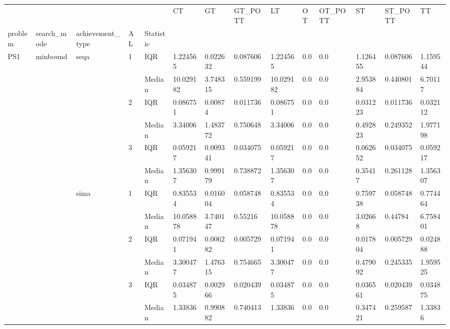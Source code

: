 \begin{tabular}{llllllllllllll}
\toprule
    &       &      &   &        &         CT &         GT &   GT\_POTT &         LT &        OT &   OT\_POTT &         ST &   ST\_POTT &         TT \\
problem & search\_mode & achievement\_type & AL & Statistic &            &            &           &            &           &           &            &           &            \\
\midrule
PS1 & minbound & seqa & 1 & IQR &   1.224565 &   0.022632 &  0.087606 &   1.224565 &       0.0 &       0.0 &   1.126455 &  0.087606 &   1.159544 \\
    &       &      &   & Median &  10.029182 &   3.748315 &  0.559199 &  10.029182 &       0.0 &       0.0 &   2.953884 &  0.440801 &    6.70117 \\
    &       &      & 2 & IQR &   0.086751 &    0.00874 &  0.011736 &   0.086751 &       0.0 &       0.0 &   0.031223 &  0.011736 &   0.032112 \\
    &       &      &   & Median &    3.34006 &   1.483772 &  0.750648 &    3.34006 &       0.0 &       0.0 &   0.492823 &  0.249352 &   1.977198 \\
    &       &      & 3 & IQR &   0.059217 &   0.009341 &  0.034075 &   0.059217 &       0.0 &       0.0 &   0.062652 &  0.034075 &   0.059217 \\
    &       &      &   & Median &   1.356307 &   0.999179 &  0.738872 &   1.356307 &       0.0 &       0.0 &    0.35417 &  0.261128 &   1.356307 \\
    &       & sima & 1 & IQR &   0.835534 &   0.016004 &  0.058748 &   0.835534 &       0.0 &       0.0 &   0.759738 &  0.058748 &   0.774464 \\
    &       &      &   & Median &  10.058878 &   3.740147 &   0.55216 &  10.058878 &       0.0 &       0.0 &    3.02668 &   0.44784 &   6.758401 \\
    &       &      & 2 & IQR &   0.071941 &   0.006282 &  0.005729 &   0.071941 &       0.0 &       0.0 &   0.017804 &  0.005729 &   0.024888 \\
    &       &      &   & Median &   3.300477 &   1.476315 &  0.754665 &   3.300477 &       0.0 &       0.0 &   0.479092 &  0.245335 &   1.959525 \\
    &       &      & 3 & IQR &   0.034875 &   0.002966 &  0.020439 &   0.034875 &       0.0 &       0.0 &   0.036561 &  0.020439 &   0.034875 \\
    &       &      &   & Median &    1.33836 &   0.990882 &  0.740413 &    1.33836 &       0.0 &       0.0 &   0.347421 &  0.259587 &    1.33836 \\

\end{tabular}
